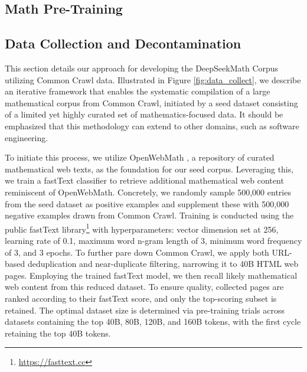 \begin{itemize}[topsep=0pt]
\section{Math Pre-Training}

\subsection{Data Collection and Decontamination} This section details our approach for developing the DeepSeekMath Corpus utilizing Common Crawl data. Illustrated in Figure \ref{fig:data_collect}, we describe an iterative framework that enables the systematic compilation of a large mathematical corpus from Common Crawl, initiated by a seed dataset consisting of a limited yet highly curated set of mathematics-focused data. It should be emphasized that this methodology can extend to other domains, such as software engineering.

To initiate this process, we utilize OpenWebMath \citep{openwebmath}, a repository of curated mathematical web texts, as the foundation for our seed corpus. Leveraging this, we train a fastText classifier \citep{joulin2016fasttext} to retrieve additional mathematical web content reminiscent of OpenWebMath. Concretely, we randomly sample 500,000 entries from the seed dataset as positive examples and supplement these with 500,000 negative examples drawn from Common Crawl. Training is conducted using the public fastText library\footnote{\url{https://fasttext.cc}} with hyperparameters: vector dimension set at 256, learning rate of 0.1, maximum word n-gram length of 3, minimum word frequency of 3, and 3 epochs. To further pare down Common Crawl, we apply both URL-based deduplication and near-duplicate filtering, narrowing it to 40B HTML web pages. Employing the trained fastText model, we then recall likely mathematical web content from this reduced dataset. To ensure quality, collected pages are ranked according to their fastText score, and only the top-scoring subset is retained. The optimal dataset size is determined via pre-training trials across datasets containing the top 40B, 80B, 120B, and 160B tokens, with the first cycle retaining the top 40B tokens.


\end{itemize}
